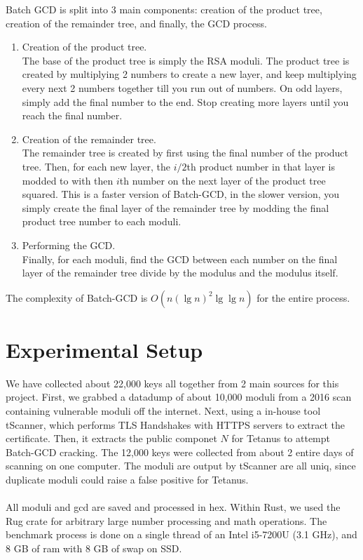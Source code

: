 \documentclass[10pt, letterpaper]{article}
\begin{document}
Batch GCD is split into 3 main components: creation of the product tree, creation of the remainder tree, and finally, the GCD process.

\begin{enumerate}
\item Creation of the product tree. \\
  The base of the product tree is simply the RSA moduli. The product tree is created by multiplying 2 numbers to create a new layer, and keep multiplying every next 2 numbers together till you run out of numbers. On odd layers, simply add the final number to the end. Stop creating more layers until you reach the final number.
\item Creation of the remainder tree. \\
  The remainder tree is created by first using the final number of the product tree. Then, for each new layer, the $i/2$th product number in that layer is modded to with then $i$th number on the next layer of the product tree squared. This is a faster version of Batch-GCD, in the slower version, you simply create the final layer of the remainder tree by modding the final product tree number to each moduli.
\item Performing the GCD. \\
  Finally, for each moduli, find the GCD between each number on the final layer of the remainder tree divide by the modulus and the modulus itself.
\end{enumerate}

The complexity of Batch-GCD is $O(n(\lg{n})^2 \lg{\lg{n}})$ for the entire process.

\begin{reconstruction}

\end{reconstruction}

\section{Experimental Setup}
We have collected about 22,000 keys all together from 2 main sources for this project. First, we grabbed a datadump of about 10,000 moduli from a 2016 scan containing vulnerable moduli off the internet. Next, using a in-house tool tScanner, which performs TLS Handshakes with HTTPS servers to extract the certificate. Then, it extracts the public componet $N$ for Tetanus to attempt Batch-GCD cracking. The 12,000 keys were collected from about 2 entire days of scanning on one computer. The moduli are output by tScanner are all uniq, since duplicate moduli could raise a false positive for Tetanus.\\
\\
All moduli and gcd are saved and processed in hex. Within Rust, we used the Rug crate for arbitrary large number processing and math operations. The benchmark process is done on a single thread of an Intel i5-7200U (3.1 GHz), and 8 GB of ram with 8 GB of swap on SSD. 
\end{document}
